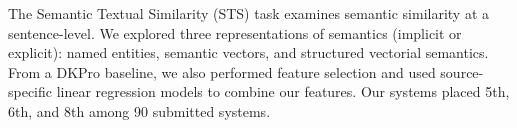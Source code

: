 The Semantic Textual Similarity (STS) task examines semantic similarity at a sentence-level.  We explored three representations of semantics (implicit or
 explicit): named entities, semantic vectors, and structured vectorial
 semantics.  From a DKPro baseline, we also performed feature selection and used
 source-specific linear regression models to combine our features. Our systems
 placed 5th, 6th, and 8th among 90 submitted systems.

